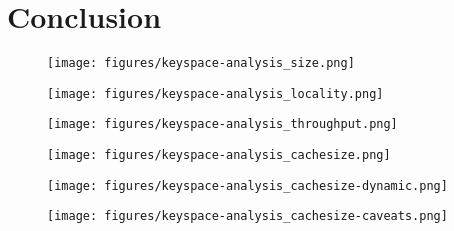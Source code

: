 \section{Conclusion}
\begin{figure}[tb]
  \noindent\texttt{[image: figures/keyspace-analysis\_size.png]}\\
  \caption{\label{fig:keyspace-analysis_size}}
\end{figure}
\begin{figure}[tb]
  \noindent\texttt{[image: figures/keyspace-analysis\_locality.png]}\\
  \caption{\label{fig:keyspace-analysis_locality}}
\end{figure}
\begin{figure}[tb]
  \noindent\texttt{[image: figures/keyspace-analysis\_throughput.png]}\\
  \caption{\label{fig:keyspace-analysis_throughput}}
\end{figure}
\begin{figure}[tb]
  \noindent\texttt{[image: figures/keyspace-analysis\_cachesize.png]}\\
  \caption{\label{fig:keyspace-analysis_cachesize}}
\end{figure}
\begin{figure}[tb]
  \noindent\texttt{[image: figures/keyspace-analysis\_cachesize-dynamic.png]}\\
  \caption{\label{fig:keyspace-analysis_cachesize-dynamic}}
\end{figure}
\begin{figure}[tb]
  \noindent\texttt{[image: figures/keyspace-analysis\_cachesize-caveats.png]}\\
  \caption{\label{fig:keyspace-analysis_cachesize-caveats}}
\end{figure}

